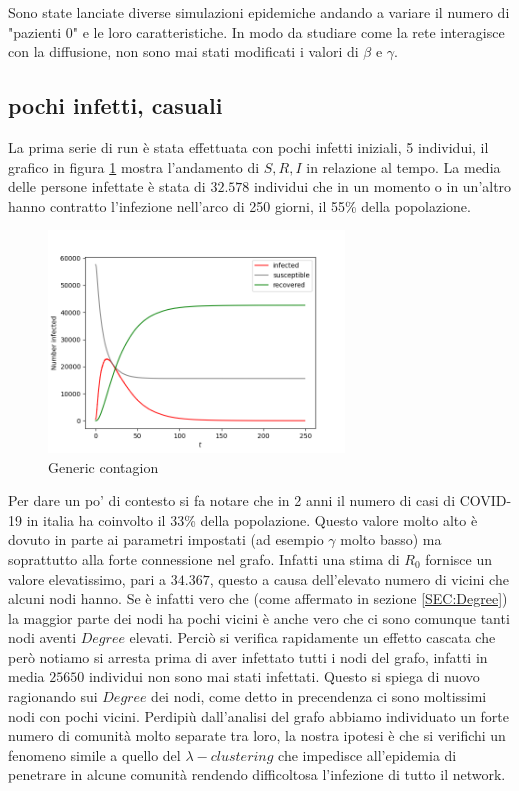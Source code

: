 \documentclass[a4paper]{article}
\begin{document}
Sono state lanciate diverse simulazioni epidemiche andando a variare il numero di "pazienti 0" e le loro caratteristiche.
In modo da studiare come la rete interagisce con la diffusione, non sono mai stati modificati i valori di $\beta$ e $\gamma$.\\

\subsection{pochi infetti, casuali}
La prima serie di run è stata effettuata con pochi infetti iniziali, 5 individui, il grafico in figura \ref{FIG:generic} mostra l'andamento di $S, R, I$ in relazione al tempo.
La media delle persone infettate è stata di $32.578$ individui che in un momento o in un'altro hanno contratto l'infezione nell'arco di 250 giorni, il 55\% della popolazione.\\
\begin{figure}[!ht]
\centering
\includegraphics[width=0.7\textwidth]{generic_run.png}
\caption{Generic contagion} \label{FIG:generic}
\end{figure}

Per dare un po' di contesto si fa notare che in 2 anni il numero di casi di COVID-19 in italia ha coinvolto il 33\% della popolazione.
Questo valore molto alto è dovuto in parte ai parametri impostati (ad esempio $\gamma$ molto basso) ma soprattutto alla forte connessione nel grafo.
Infatti una stima di $R_0$ fornisce un valore elevatissimo, pari a $34.367$, questo a causa dell'elevato numero di vicini che alcuni nodi hanno.
Se è infatti vero che (come affermato in sezione \ref{SEC:Degree}) la maggior parte dei nodi ha pochi vicini è anche vero che ci sono comunque tanti nodi aventi $Degree$ elevati.
Perciò si verifica rapidamente un effetto cascata che però notiamo si arresta prima di aver infettato tutti i nodi del grafo, infatti in media $25650$ individui non sono mai stati infettati.
Questo si spiega di nuovo ragionando sui $Degree$ dei nodi, come detto in precendenza ci sono moltissimi nodi con pochi vicini.
Perdipiù dall'analisi del grafo abbiamo individuato un forte numero di comunità molto separate tra loro, la nostra ipotesi è che si verifichi un fenomeno simile a quello del $\lambda - clustering$ che impedisce all'epidemia di penetrare in alcune comunità rendendo difficoltosa l'infezione di tutto il network.
\end{document}
